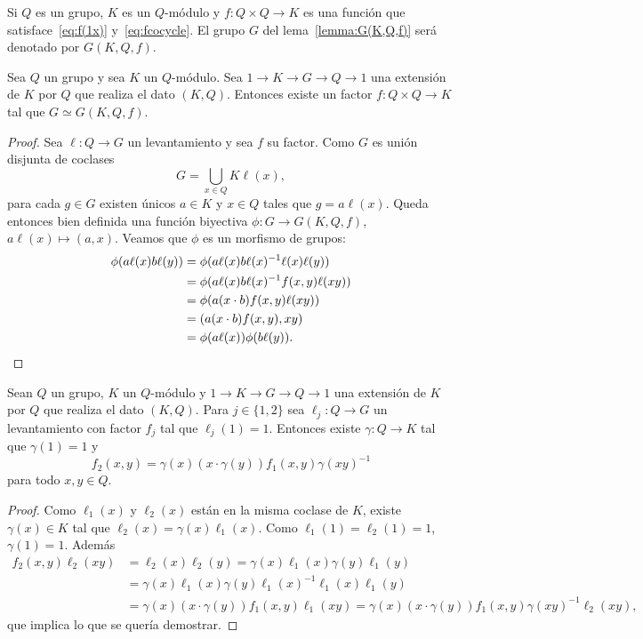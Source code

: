 Si $Q$ es un grupo, $K$ es un $Q$-módulo y $f\colon Q\times Q\to K$ es una
función que satisface~\eqref{eq:f(1x)} y~\eqref{eq:fcocycle}. El grupo $G$ del
lema~\ref{lemma:G(K,Q,f)} será denotado por $G(K,Q,f)$. 

\begin{lemma}
	\label{lemma:existe_f}
	Sea $Q$ un grupo y sea $K$ un $Q$-módulo. Sea $1\to K\to G\to Q\to 1$ una
	extensión de $K$ por $Q$ que realiza el dato $(K,Q)$. Entonces existe
	un factor $f\colon Q\times Q\to K$ tal que $G\simeq G(K,Q,f)$. 
\end{lemma}

\begin{proof}
	Sea $\ell\colon Q\to G$ un levantamiento y sea $f$ su factor. Como $G$ es
	unión disjunta de coclases
	\[
		G=\bigcup_{x\in Q}K\ell(x),
	\]
	para cada $g\in G$ existen únicos $a\in K$ y $x\in Q$ tales que
	$g=a\ell(x)$. Queda entonces bien definida una función biyectiva
	$\phi\colon G\to G(K,Q,f)$, $a\ell(x)\mapsto (a,x)$. Veamos que $\phi$ es
	un morfismo de grupos: 
	\begin{align*}
		\phi(a\ell(x)b\ell(y)) 
		&=\phi(a\ell(x)b\ell(x)^{-1}\ell(x)\ell(y))\\
		&=\phi(a\ell(x)b\ell(x)^{-1}f(x,y)\ell(xy))\\
		&=\phi(a(x\cdot b)f(x,y)\ell(xy))\\
		&=(a(x\cdot b)f(x,y),xy)\\
		&=\phi(a\ell(x))\phi(b\ell(y)).\qedhere
	\end{align*}
\end{proof}

\begin{lemma}
	\label{lemma:coborde}
	Sean $Q$ un grupo, $K$ un $Q$-módulo y $1\to K\to G\to Q\to 1$ una
	extensión de $K$ por $Q$ que realiza el dato $(K,Q)$. Para $j\in\{1,2\}$
	sea $\ell_j\colon Q\to G$ un levantamiento con factor $f_j$ tal que
	$\ell_j(1)=1$.  Entonces existe $\gamma\colon Q\to K$ tal que $\gamma(1)=1$
	y 
	\[
		f_2(x,y)=\gamma(x)(x\cdot \gamma(y))f_1(x,y)\gamma(xy)^{-1}
	\]
	para todo $x,y\in Q$.
\end{lemma}

\begin{proof}
	Como $\ell_1(x)$ y $\ell_2(x)$ están en la misma coclase de
	$K$, existe $\gamma(x)\in K$ tal que $\ell_2(x)=\gamma(x)\ell_1(x)$. Como
	$\ell_1(1)=\ell_2(1)=1$, $\gamma(1)=1$. Además 
	\begin{align*}
		f_2(x,y)\ell_2(xy)&=\ell_2(x)\ell_2(y) = \gamma(x)\ell_1(x)\gamma(y)\ell_1(y)\\
		&=\gamma(x)\ell_1(x)\gamma(y)\ell_1(x)^{-1}\ell_1(x)\ell_1(y)\\
		&=\gamma(x)(x\cdot \gamma(y))f_1(x,y)\ell_1(xy)
		=\gamma(x)(x\cdot \gamma(y))f_1(x,y)\gamma(xy)^{-1}\ell_2(xy),
	\end{align*}
	que implica lo que se quería demostrar.
\end{proof}

